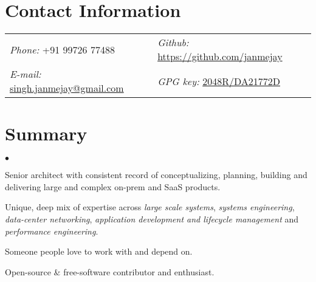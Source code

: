 \documentclass[margin,line]{res}
\newenvironment{list2}{
  \begin{list}{$\bullet$}{%
      \setlength{\itemsep}{0in}
      \setlength{\parsep}{0in} \setlength{\parskip}{0in}
      \setlength{\topsep}{0in} \setlength{\partopsep}{0in} 
      \setlength{\leftmargin}{0.2in}}}{\end{list}}
\begin{document}

\begin{resume}
  \section{\sc Contact Information}
  \vspace{.05in}
  \begin{tabular}{@{}p{3.3in}p{3.3in}}
    {\it Phone:}   +91 99726 77488                                                   &  {\it Github:}  \url{https://github.com/janmejay} \\     
    {\it E-mail:}  \href{mailto:singh.janmejay@gmail.com}{singh.janmejay@gmail.com}  &  {\it GPG key:} \href{http://pgp.mit.edu:11371/pks/lookup?op=vindex&search=0x3A9F2343DA21772D}{2048R/DA21772D}\\
  \end{tabular}

\section{\sc Summary}
\vspace{.6cm}
\begin{list2}
\item Senior architect with consistent record of conceptualizing, planning, building and delivering large and complex on-prem and SaaS products.
  \vspace{.1cm}
\item Unique, deep mix of expertise across {\it large scale systems}, {\it systems engineering}, {\it data-center networking}, {\it application development and lifecycle management} and {\it performance engineering}.
  \vspace{.1cm}
\item Someone people love to work with and depend on.
  \vspace{.1cm}
\item Open-source \& free-software contributor and enthusiast.
\end{list2}


\end{resume}
\end{document}
